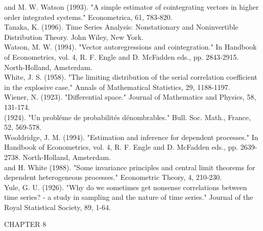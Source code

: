 \documentclass[10pt]{article}
\begin{document}
and M. W. Watson (1993). "A simple estimator of cointegrating vectors in higher order integrated systems." Econometrica, 61, 783-820.\\
Tanaka, K. (1996). Time Series Analysis: Nonstationary and Noninvertible Distribution Theory. John Wiley, New York.\\
Watson, M. W. (1994). "Vector autoregressions and cointegration." In Handbook of Econometrics, vol. 4, R. F. Engle and D. McFadden eds., pp. 2843-2915. North-Holland, Amsterdam.\\
White, J. S. (1958). "The limiting distribution of the serial correlation coefficient in the explosive case." Annals of Mathematical Statistics, 29, 1188-1197.\\
Wiener, N. (1923). "Differential space." Journal of Mathematics and Physics, 58, 131-174.\\
(1924). "Un probléme de probabilités dénombrables." Bull. Soc. Math., France, 52, 569-578.\\
Wooldridge, J. M. (1994). "Estimation and inference for dependent processes." In Handbook of Econometrics, vol. 4, R. F. Engle and D. McFadden eds., pp. 2639-2738. North-Holland, Amsterdam.\\
and H. White (1988). "Some invariance principles and central limit theorems for dependent heterogeneous processes." Econometric Theory, 4, 210-230.\\
Yule, G. U. (1926). "Why do we sometimes get nonsense correlations between time series? - a study in sampling and the nature of time series." Journal of the Royal Statistical Society, 89, 1-64.

CHAPTER 8
\end{document}
